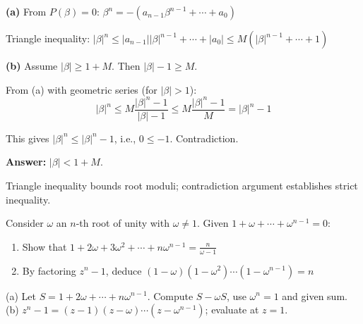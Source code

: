 \begin{solution}
\textbf{(a)} From $P(\beta)=0$: $\beta^n = -(a_{n-1}\beta^{n-1}+\cdots+a_0)$

Triangle inequality: $|\beta|^n \le |a_{n-1}||\beta|^{n-1}+\cdots+|a_0| \le M(|\beta|^{n-1}+\cdots+1)$

\textbf{(b)} Assume $|\beta| \ge 1+M$. Then $|\beta|-1 \ge M$.

From (a) with geometric series (for $|\beta|>1$):
$$
|\beta|^n \le M\frac{|\beta|^n-1}{|\beta|-1} \le M\frac{|\beta|^n-1}{M} = |\beta|^n-1
$$

This gives $|\beta|^n \le |\beta|^n - 1$, i.e., $0 \le -1$. Contradiction.

\textbf{Answer:} $|\beta| < 1+M$.
\end{solution}

\begin{takeaways}
Triangle inequality bounds root moduli; contradiction argument establishes strict inequality.
\end{takeaways}

\vspace{1cm}

\begin{problem}
Consider $\omega$ an $n$-th root of unity with $\omega \neq 1$. Given $1 + \omega + \cdots + \omega^{n-1} = 0$:
\begin{enumerate}
    \item Show that $1 + 2\omega + 3\omega^2 + \cdots + n\omega^{n-1} = \frac{n}{\omega-1}$
    \item By factoring $z^n - 1$, deduce $(1 - \omega)(1 - \omega^2)\cdots (1 - \omega^{n-1}) = n$
\end{enumerate}
\end{problem}

\vspace{0.5cm}
\begin{hintbox}
(a) Let $S=1+2\omega+\cdots+n\omega^{n-1}$. Compute $S-\omega S$, use $\omega^n=1$ and given sum. (b) $z^n-1=(z-1)(z-\omega)\cdots(z-\omega^{n-1})$; evaluate at $z=1$.
\end{hintbox}

